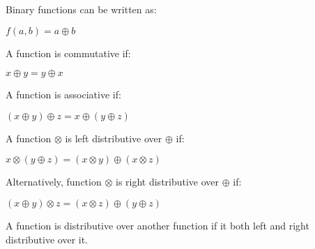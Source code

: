 Binary functions can be written as:

\(f(a,b)=a\oplus b\)

A function is commutative if:

\(x\oplus y = y\oplus x\)

A function is associative if:

\((x\oplus y)\oplus z = x\oplus (y\oplus z)\)

A function \(\otimes \) is left distributive over \(\oplus \) if:

\(x\otimes (y\oplus z)=(x\otimes y) \oplus (x\otimes z)\)

Alternatively, function \(\otimes \) is right distributive over \(\oplus \) if:

\((x\oplus y)\otimes z=(x\otimes z) \oplus (y\oplus z)\)

A function is distributive over another function if it both left and right distributive over it.

